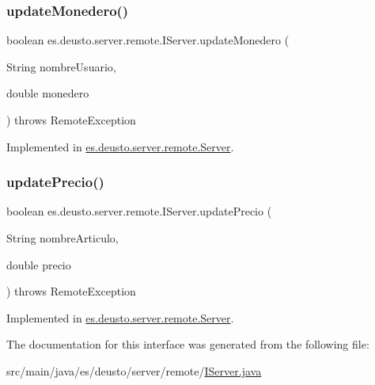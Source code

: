 \subsubsection{\texorpdfstring{updateMonedero()}{updateMonedero()}}
{\footnotesize\ttfamily boolean es.\+deusto.\+server.\+remote.\+I\+Server.\+update\+Monedero (\begin{DoxyParamCaption}\item[{String}]{nombre\+Usuario,  }\item[{double}]{monedero }\end{DoxyParamCaption}) throws Remote\+Exception}



Implemented in \mbox{\hyperlink{classes_1_1deusto_1_1server_1_1remote_1_1_server_af6936fcce306cd9c8881f81375631a46}{es.\+deusto.\+server.\+remote.\+Server}}.

\mbox{\label{interfacees_1_1deusto_1_1server_1_1remote_1_1_i_server_a1debc07cec3cad9a483dee4dfa79af72}} 
\subsubsection{\texorpdfstring{updatePrecio()}{updatePrecio()}}
{\footnotesize\ttfamily boolean es.\+deusto.\+server.\+remote.\+I\+Server.\+update\+Precio (\begin{DoxyParamCaption}\item[{String}]{nombre\+Articulo,  }\item[{double}]{precio }\end{DoxyParamCaption}) throws Remote\+Exception}



Implemented in \mbox{\hyperlink{classes_1_1deusto_1_1server_1_1remote_1_1_server_a48e59414c1c8e7b69f7f795b61bd5311}{es.\+deusto.\+server.\+remote.\+Server}}.



The documentation for this interface was generated from the following file\+:\begin{DoxyCompactItemize}
\item 
src/main/java/es/deusto/server/remote/\mbox{\hyperlink{_i_server_8java}{I\+Server.\+java}}\end{DoxyCompactItemize}
